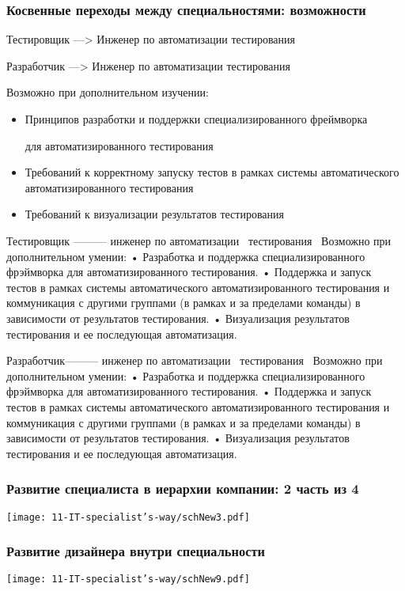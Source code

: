 \documentclass{../industrial-development}
\begin{document}
 \begin{frame} \frametitle{Косвенные переходы между специальностями: возможности }

 \begin{block}{Тестировщик --->  Инженер по автоматизации тестирования    

Разработчик --->  Инженер по автоматизации тестирования }
Возможно при дополнительном изучении:
  \end{block}
\begin{itemize}
  \item Принципов разработки и поддержки специализированного фреймворка 

для автоматизированного тестирования
  \item Требований к корректному запуску тестов в рамках системы автоматического автоматизированного тестирования
\item Требований к визуализации результатов тестирования
  \end{itemize}
\end{frame}

\lecturenotes


Тестировщик --------- инженер по автоматизации~\cite{hh} тестирования~\cite{itcf}
Возможно при дополнительном умении:
•	Разработка и поддержка специализированного фрэймворка для автоматизированного тестирования.
•	Поддержка и запуск тестов в рамках системы автоматического автоматизированного тестирования и коммуникация с другими группами (в рамках и за пределами команды) в зависимости от результатов тестирования.
•	Визуализация результатов тестирования и ее последующая автоматизация.


Разработчик--------- инженер по автоматизации~\cite{hh} тестирования~\cite{itcf}
Возможно при дополнительном умении:
•	Разработка и поддержка специализированного фрэймворка для автоматизированного тестирования.
•	Поддержка и запуск тестов в рамках системы автоматического автоматизированного тестирования и коммуникация с другими группами (в рамках и за пределами команды) в зависимости от результатов тестирования.
•	Визуализация результатов тестирования и ее последующая автоматизация.


\begin{frame} \frametitle{Развитие  специалиста в иерархии компании: 2 часть из 4 }
  \centerline{\texttt{[image: 11-IT-specialist's-way/schNew3.pdf]}}
\end{frame}

\begin{frame} \frametitle{Развитие дизайнера внутри специальности}
  \centerline{\texttt{[image: 11-IT-specialist's-way/schNew9.pdf]}}
\end{frame}
\end{document}
